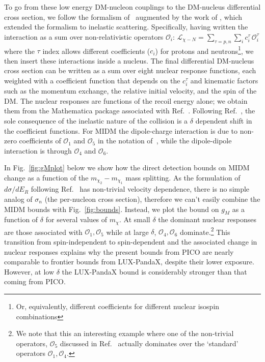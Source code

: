 \documentclass[11pt]{article}
\begin{document}
\begin{itemize}
To go from these low energy DM-nucleon couplings to the DM-nucleus differential cross section, we follow the formalism of~\cite{Fitzpatrick:2012ix,Anand:2013yka} augmented by the work of \cite{Barello:2014uda}, which extended the formalism to inelastic scattering. Specifically, having written the interaction as a sum over non-relativistic operators $\mathcal O_i$: $\mathcal L_{\chi-N} = \sum\limits_{\tau = p,n}\sum\limits_i c^{\tau}_i\, \mathcal O^{\tau}_i$ where the $\tau$ index allows different coefficients ($c_i$) for protons and neutrons\footnote{Or, equivalently, different coefficients for different nuclear isospin combinations}, we then insert these interactions inside a nucleus.  The final differential DM-nucleus cross section can be written as a sum over eight nuclear response functions, each weighted with a coefficient function that depends on the $c^{\tau}_i$ and kinematic factors such as the momentum exchange, the relative initial velocity, and the spin of the DM.  The nuclear responses are functions of the recoil energy alone; we obtain them from the Mathematica package associated with Ref.~\cite{Anand:2013yka}. Following Ref.~\cite{Barello:2014uda}, the sole consequence of the inelastic nature of the collision is a $\delta$ dependent shift in the coefficient functions.  For MIDM the dipole-charge interaction is due to non-zero coefficients of $\mathcal O_{1}$ and $\mathcal O_{5}$ in the notation of~\cite{Fitzpatrick:2012ix}, while the dipole-dipole interaction is through $\mathcal O_{4}$ and $\mathcal O_{6}$.

In Fig.~\ref{fig:gMplot} below we show how the direct detection bounds on MIDM change as a function of the $m_{\chi_2} - m_{\chi_1}$ mass splitting. As the formulation of $d\sigma/d E_R$ following Ref.~\cite{Anand:2013yka} has non-trivial velocity dependence, there is no simple analog of $\sigma_n$ (the per-nucleon cross section), therefore we can't easily combine the MIDM bounds with Fig.~\ref{fig:bounds}. Instead, we plot the bound on $g_M$ as a function of $\delta$ for several values of $m_{\chi}$.  At small $\delta$ the dominant nuclear responses are those associated with $\mathcal O_1, \mathcal{O}_5$ while at large $\delta$, 
$\mathcal{O}_{4},\mathcal{O}_{6}$ dominate.\footnote{We note that this an interesting example where  one of the non-trivial operators, $\mathcal O_5$ discussed in Ref.~\cite{Anand:2013yka} actually dominates over the `standard' operators $\mathcal O_1, \mathcal O_4$.}  This transition from spin-independent to spin-dependent and the associated change in nuclear responses explains why the present bounds from PICO are nearly comparable to frontier bounds from LUX-PandaX, despite their lower exposure.  However, at low $\delta$ the LUX-PandaX bound is considerably stronger than that coming from PICO.


\end{itemize}
\end{document}
